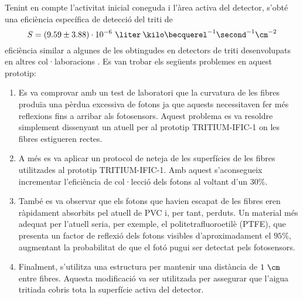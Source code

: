 Tenint en compte l'activitat inicial coneguda i l'àrea activa del detector, s'obté una eficiència específica de detecció del triti de
$$S = (9.59 \pm 3.88)\cdot{} 10^{-6}~\liter\:\kilo\becquerel^{-1}\second^{-1}\cm^{-2}$$
eficiència similar a algunes de les obtingudes en detectors de triti desenvolupats en altres col·laboracions \cite{Muramatsu, Moghissi}. Es van trobar els següents problemes en aquest prototip:

\begin{enumerate}
\item{} Es va comprovar amb un test de laboratori que la curvatura de les fibres produïa una pèrdua excessiva de fotons ja que aquests necessitaven fer més reflexions fins a arribar als fotosensors. Aquest problema es va resoldre simplement dissenyant un atuell per al prototip TRITIUM-IFIC-1 on les fibres estigueren rectes.

\item{} A més es va aplicar un protocol de neteja de les superfícies de les fibres utilitzades al prototip TRITIUM-IFIC-1. Amb aquest s'aconsegueix incrementar l'eficiència de col·lecció dels fotons al voltant d'un $30\%$.

\item{} També es va observar que els fotons que havien escapat de les fibres eren ràpidament absorbits pel atuell de PVC i, per tant, perduts. Un material més adequat per l'atuell seria, per exemple, el politetrafluoroetilè (PTFE), que presenta un factor de reflexió dels fotons visibles d'aproximadament el $95\%$, augmentant la probabilitat de que el fotó pugui ser detectat pels fotosensors.

\item{} Finalment, s'utilitza una estructura per mantenir una distància de $1~\cm$ entre fibres. Aquesta modificació va ser utilitzada per assegurar que l'aigua tritiada cobris tota la superfície activa del detector.

\end{enumerate}

